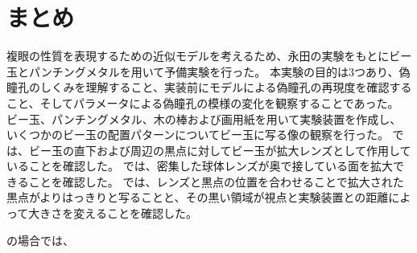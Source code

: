 \section{まとめ}
\label{SEcperimentTotal}

複眼の性質を表現するための近似モデルを考えるため、永田の実験をもとにビー玉とパンチングメタルを用いて予備実験を行った。
本実験の目的は3つあり、偽瞳孔のしくみを理解すること、実装前にモデルによる偽瞳孔の再現度を確認すること、そしてパラメータによる偽瞳孔の模様の変化を観察することであった。
ビー玉、パンチングメタル、木の棒および画用紙を用いて実験装置を作成し、いくつかのビー玉の配置パターンについてビー玉に写る像の観察を行った。
では、ビー玉の直下および周辺の黒点に対してビー玉が拡大レンズとして作用していることを確認した。
では、密集した球体レンズが奥で接している面を拡大できることを確認した。
では、レンズと黒点の位置を合わせることで拡大された黒点がよりはっきりと写ることと、その黒い領域が視点と実験装置との距離によって大きさを変えることを確認した。

の場合では、
